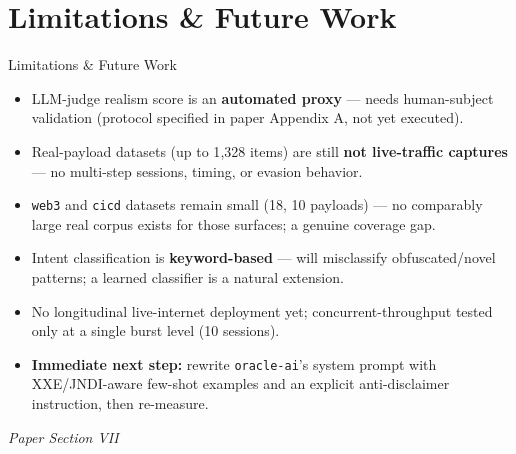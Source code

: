 \documentclass[aspectratio=169, 11pt]{beamer}
\newcommand{\srcnote}[1]{{\footnotesize\color{gray}\textit{#1}}}
\begin{document}
\section{Limitations \& Future Work}
\begin{frame}{Limitations \& Future Work}
    \begin{itemize}
        \item LLM-judge realism score is an \textbf{automated proxy} --- needs human-subject validation (protocol specified in paper Appendix A, not yet executed).
        \item Real-payload datasets (up to 1{,}328 items) are still \textbf{not live-traffic captures} --- no multi-step sessions, timing, or evasion behavior.
        \item \texttt{web3} and \texttt{cicd} datasets remain small (18, 10 payloads) --- no comparably large real corpus exists for those surfaces; a genuine coverage gap.
        \item Intent classification is \textbf{keyword-based} --- will misclassify obfuscated/novel patterns; a learned classifier is a natural extension.
        \item No longitudinal live-internet deployment yet; concurrent-throughput tested only at a single burst level (10 sessions).
        \item \textbf{Immediate next step:} rewrite \texttt{oracle-ai}'s system prompt with XXE/JNDI-aware few-shot examples and an explicit anti-disclaimer instruction, then re-measure.
    \end{itemize}
    \srcnote{Paper Section VII}
\end{frame}

\end{document}
